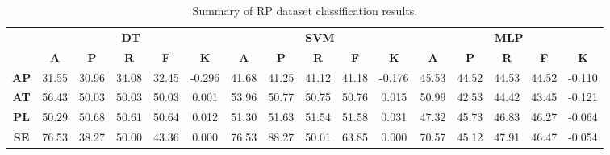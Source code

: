 \begin{landscape}
\begin{table}[htbp]
\footnotesize
\centering
\caption{Summary of RP dataset classification results.}
\label{tab:base_female}
\begin{tabular}{|c|c|c|c|c|c|c|c|c|c|c|c|c|c|c|c|}
\hline
\multirow{2}{*}{}	& \multicolumn{5}{c|}{\textbf{DT}}												& \multicolumn{5}{c|}{\textbf{SVM}}												& \multicolumn{5}{c|}{\textbf{MLP}}												\\ \cline{2-16} 
					& \textbf{A}	& \textbf{P}	& \textbf{R}	& \textbf{F}	& \textbf{K}	& \textbf{A}	& \textbf{P}	& \textbf{R}	& \textbf{F}	& \textbf{K}	& \textbf{A}	& \textbf{P}	& \textbf{R}	& \textbf{F}	& \textbf{K}	\\ \hline
\textbf{AP}			& 31.55			& 30.96			& 34.08			& 32.45			& -0.296			& 41.68			& 41.25			& 41.12			& 41.18			& -0.176			& 45.53			& 44.52			& 44.53			& 44.52			& -0.110			\\ \hline
\textbf{AT}			& 56.43			& 50.03			& 50.03			& 50.03			& 0.001			& 53.96			& 50.77			& 50.75			& 50.76			& 0.015			& 50.99			& 42.53			& 44.42			& 43.45			& -0.121			\\ \hline
\textbf{PL}			& 50.29			& 50.68			& 50.61			& 50.64			& 0.012			& 51.30			& 51.63			& 51.54			& 51.58			& 0.031			& 47.32			& 45.73			& 46.83			& 46.27			& -0.064			\\ \hline
\textbf{SE}			& 76.53			& 38.27			& 50.00			& 43.36			& 0.000			& 76.53			& 88.27			& 50.01			& 63.85			& 0.000			& 70.57			& 45.12			& 47.91			& 46.47			& -0.054			\\ \hline
\end{tabular}
\end{table}
\end{landscape}